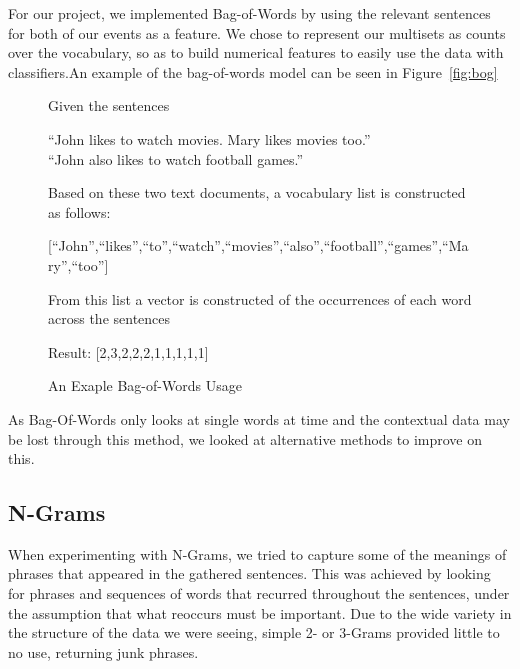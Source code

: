 \documentclass[bsc,frontabs,twoside,singlespacing,parskip,deptreport]{infthesis}     %
\begin{document}
For our project, we implemented Bag-of-Words by using the relevant sentences for both of our events as a feature.
We chose to represent our multisets as counts over the vocabulary, so as to build numerical features to easily
use the data with classifiers.An example of the bag-of-words model can be seen in Figure~\ref{fig:bog}
\begin{figure}
\begin{tcolorbox}[width=\textwidth,
                  interior hidden,
                  boxsep=10pt,
                  left=0pt,
                  right=0pt,
                  top=2pt,
                  ]%
  Given the sentences \vspace{0.5em}\\
  \begin{center}``John likes to watch movies. Mary likes movies too.''\\
  ``John also likes to watch football games.''\vspace{1em}\\
   \end{center}
    Based on these two text documents, a vocabulary list is constructed as follows:\vspace{1em}\\
    \begin{center}
  [``John'',``likes'',``to'',``watch'',``movies'',``also'',``football'',``games'',``Mary'',``too'']\vspace{1em}\\
\end{center}
    From this list a vector is constructed of the occurrences
    of each word across the sentences\vspace{1em}\\
 \begin{center} 
  Result: [2,3,2,2,2,1,1,1,1,1]
\end{center}
\end{tcolorbox}
\caption{An Exaple Bag-of-Words Usage}
\label{fig:bow}
\end{figure}

As Bag-Of-Words only looks at single words at time and the contextual data may be lost through this method, we looked at
alternative methods to improve on this.

\subsection{N-Grams}
When experimenting with N-Grams, we tried to capture some of the meanings of phrases that appeared in the gathered
sentences.
This was achieved by looking for phrases and sequences of words that recurred throughout the sentences, under the assumption
that what reoccurs must be important. Due to the wide variety in the structure of the data we were seeing,
simple 2- or 3-Grams provided little to no use, returning junk phrases.
\end{document}
